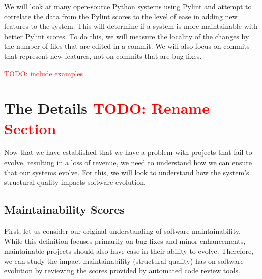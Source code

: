\documentclass[12pt,conference]{IEEEtran}
\newcommand\todo[1]{\textcolor{red}{#1}}
\begin{document}
We will look at many open-source Python systems using Pylint and attempt to correlate the data from the Pylint scores to the level of ease in adding new features to the system. This will determine if a system is more maintainable with better Pylint scores. To do this, we will measure the locality of the changes by the number of files that are edited in a commit. We will also focus on commits that represent new features, not on commits that are bug fixes.

\todo{TODO: include examples}


\vspace{0.5cm}
\section{The Details \todo{TODO: Rename Section}}
\vspace{0.25cm}


Now that we have established that we have a problem with projects that fail to evolve, resulting in a loss of revenue, we need to understand how we can ensure that our systems evolve. For this, we will look to understand how the system's structural quality impacts software evolution.

\subsection{Maintainability Scores} \label{sectionMaintainabilityScores}


First, let us consider our original understanding of software maintainability. While this definition focuses primarily on bug fixes and minor enhancements, maintainable projects should also have ease in their ability to evolve. Therefore, we can study the impact maintainability (structural quality) has on software evolution by reviewing the scores provided by automated code review tools.
\end{document}
